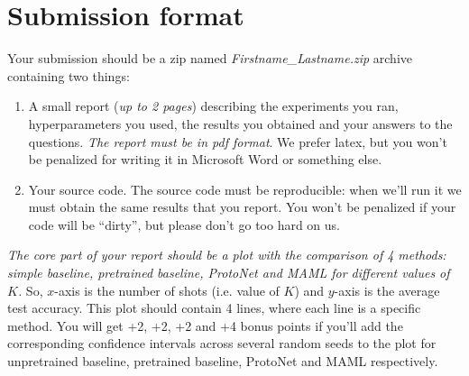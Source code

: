 \documentclass[letterpaper,12pt]{article}
\begin{document}

\section{Submission format}
Your submission should be a zip named \textit{Firstname\_Lastname.zip} archive containing two things:
\begin{enumerate}
    \item A small report (\textit{up to 2 pages}) describing the experiments you ran, hyperparameters you used, the results you obtained and your answers to the questions. \textit{The report must be in pdf format}. We prefer latex, but you won't be penalized for writing it in Microsoft Word or something else.
    \item Your source code. The source code must be reproducible: when we'll run it we must obtain the same results that you report. You won't be penalized if your code will be ``dirty'', but please don't go too hard on us. 
\end{enumerate}

\textit{The core part of your report should be a plot with the comparison of 4 methods: simple baseline, pretrained baseline, ProtoNet and MAML for different values of $K$.}
So, $x$-axis is the number of shots (i.e. value of $K$) and $y$-axis is the average test accuracy.
This plot should contain 4 lines, where each line is a specific method.
You will get +2, +2, +2 and +4 bonus points if you'll add the corresponding confidence intervals across several random seeds to the plot for unpretrained baseline, pretrained baseline, ProtoNet and MAML respectively.
\end{document}
